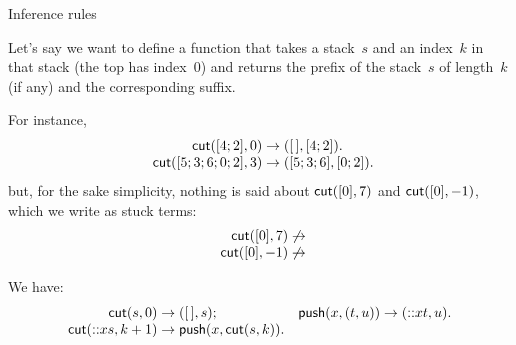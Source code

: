 %
\begin{frame}{Inference rules}

  Let's say we want to define a function  that takes a
  stack~$s$ and an index~$k$ in that stack (the top has index~0) and
  returns the prefix of the stack~$s$ of length~$k$ (if any) and the
  corresponding suffix.

  \bigskip

  For instance,
  \begin{equation*}
    \begin{array}{r@{\;}c@{\;}l@{}}
      \fun{cut}([4; 2], 0) & \rightarrow
      & (\el, [4; 2]).\\
      \fun{cut}([5; 3; 6; 0; 2], 3) & \rightarrow
      & ([5; 3; 6], [0; 2]).
    \end{array}
  \end{equation*}
  but, for the sake simplicity, nothing is said about \(\textsf{cut}([0],
  7)\) and \(\textsf{cut}([0], -1)\), which we write as stuck terms:
  \begin{equation*}
    \begin{array}{r@{\;}c@{}}
      \fun{cut}([0], 7) & \not\rightarrow \\
      \fun{cut}([0], -1) & \not\rightarrow
    \end{array}
  \end{equation*}

  We have:
  \begin{equation*}
    \begin{array}{@{}r@{\;}l@{\;}lr@{\;}l@{\;}l@{}}
      \fun{cut}(s, 0) & \rightarrow & (\el, s);
      & \fun{push}(x, (t, u)) & \rightarrow & (\cons{x}{t}, u).\\
      \fun{cut}(\cons{x}{s}, k+1) & \rightarrow
      & \fun{push}(x, \fun{cut}(s, k)).
    \end{array}
  \end{equation*}

\end{frame}

